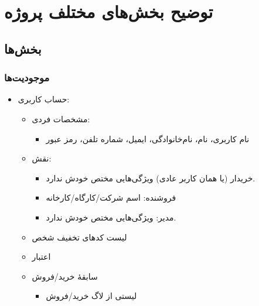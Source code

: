 \documentclass[]{article}
\begin{document}
\newpage

\section*{{\titr توضیح بخش‌های مختلف پروژه}}

\subsection*{{\titr بخش‌ها}}

\subsubsection*{{\titr موجودیت‌ها}}

\begin{itemize}

\item
حساب کاربری:

\begin{itemize}
\item
مشخصات فردی:

\begin{itemize}[label=$\blacksquare$]
\item
نام کاربری، نام، نام‌خانوادگی، ایمیل، شماره تلفن، رمز عبور 
\end{itemize}
\item
نقش:

\begin{itemize}[label=$\blacksquare$]
\item
خریدار (یا همان کاربر عادی) ویژگی‌هایی مختص خودش ندارد.	

\item
فروشنده: اسم شرکت/کارگاه/کارخانه

\item
مدیر: ویژگی‌هایی مختص خودش ندارد.

\end{itemize}

\item
لیست کدهای تخفیف شخص

\item
اعتبار

\item
سابقهٔ خرید/فروش

\begin{itemize}[label=$\blacksquare$]
\item
لیستی از لاگ خرید/فروش
\end{itemize}

\end{itemize}



\end{itemize}
\end{document}
